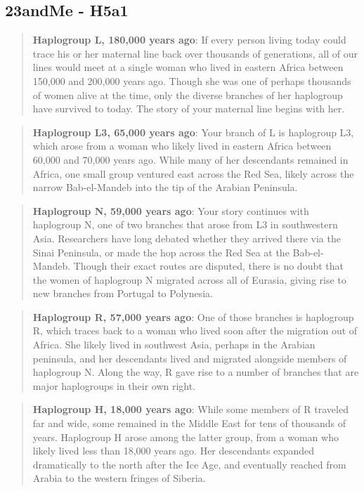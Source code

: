 \documentclass[11pt,letter]{book}
\begin{document}
\subsection{23andMe - H5a1}

\begin{quote}
\textbf{Haplogroup L, 180,000 years ago}:  If every person living today could trace his or her maternal line back over thousands of generations, all of our lines would meet at a single woman who lived in eastern Africa between 150,000 and 200,000 years ago. Though she was one of perhaps thousands of women alive at the time, only the diverse branches of her haplogroup have survived to today. The story of your maternal line begins with her. 
\end{quote}

\begin{quote}
\textbf{Haplogroup L3, 65,000 years ago}:  Your branch of L is haplogroup L3, which arose from a woman who likely lived in eastern Africa between 60,000 and 70,000 years ago. While many of her descendants remained in Africa, one small group ventured east across the Red Sea, likely across the narrow Bab-el-Mandeb into the tip of the Arabian Peninsula. 
\end{quote}

\begin{quote}
\textbf{Haplogroup N, 59,000 years ago}:  Your story continues with haplogroup N, one of two branches that arose from L3 in southwestern Asia. Researchers have long debated whether they arrived there via the Sinai Peninsula, or made the hop across the Red Sea at the Bab-el-Mandeb. Though their exact routes are disputed, there is no doubt that the women of haplogroup N migrated across all of Eurasia, giving rise to new branches from Portugal to Polynesia.
\end{quote}

\begin{quote}
\textbf{Haplogroup R, 57,000 years ago}: One of those branches is haplogroup R, which traces back to a woman who lived soon after the migration out of Africa. She likely lived in southwest Asia, perhaps in the Arabian peninsula, and her descendants lived and migrated alongside members of haplogroup N. Along the way, R gave rise to a number of branches that are major haplogroups in their own right.
\end{quote}

\begin{quote}
\textbf{Haplogroup H, 18,000 years ago}:  While some members of R traveled far and wide, some remained in the Middle East for tens of thousands of years. Haplogroup H arose among the latter group, from a woman who likely lived less than 18,000 years ago. Her descendants expanded dramatically to the north after the Ice Age, and eventually reached from Arabia to the western fringes of Siberia.
\end{quote}
\end{document}
